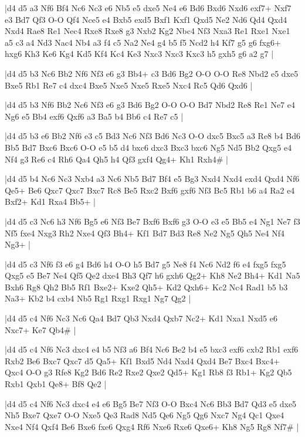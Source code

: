\whitename{}
\blackname{}
\makegametitle
|d4 d5 a3 Nf6 Bf4 Nc6 Nc3 e6 Nb5 e5 dxe5 Ne4 e6 Bd6 Bxd6 Nxd6 exf7+ Nxf7 e3 Bd7 Qf3 O-O Qf4 Nce5 e4 Bxb5 exd5 Bxf1 Kxf1 Qxd5 Ne2 Nd6 Qd4 Qxd4 Nxd4 Rae8 Re1 Nec4 Rxe8 Rxe8 g3 Nxb2 Kg2 Nbc4 Nf3 Nxa3 Re1 Rxe1 Nxe1 a5 c3 a4 Nd3 Nac4 Nb4 a3 f4 c5 Na2 Ne4 g4 b5 f5 Ncd2 h4 Kf7 g5 g6 fxg6+ hxg6 Kh3 Ke6 Kg4 Kd5 Kf4 Kc4 Ke3 Nxc3 Nxc3 Kxc3 h5 gxh5 g6 a2 g7  |

\whitename{}
\blackname{}
\makegametitle
|d4 d5 b3 Nc6 Bb2 Nf6 Nf3 e6 g3 Bb4+ c3 Bd6 Bg2 O-O O-O Re8 Nbd2 e5 dxe5 Bxe5 Rb1 Re7 c4 dxc4 Bxe5 Nxe5 Nxe5 Rxe5 Nxc4 Rc5 Qd6 Qxd6  |

\whitename{}
\blackname{}
\makegametitle
|d4 d5 b3 Nf6 Bb2 Nc6 Nf3 e6 g3 Bd6 Bg2 O-O O-O Bd7 Nbd2 Re8 Re1 Ne7 e4 Ng6 e5 Bb4 exf6 Qxf6 a3 Ba5 b4 Bb6 c4 Re7 c5  |

\whitename{}
\blackname{}
\makegametitle
|d4 d5 b3 e6 Bb2 Nf6 e3 c5 Bd3 Nc6 Nf3 Bd6 Nc3 O-O dxc5 Bxc5 a3 Re8 b4 Bd6 Bb5 Bd7 Bxc6 Bxc6 O-O e5 b5 d4 bxc6 dxc3 Bxc3 bxc6 Ng5 Nd5 Bb2 Qxg5 e4 Nf4 g3 Re6 c4 Rh6 Qa4 Qh5 h4 Qf3 gxf4 Qg4+ Kh1 Rxh4\#  |

\whitename{}
\blackname{}
\makegametitle
|d4 d5 b4 Nc6 Nc3 Nxb4 a3 Nc6 Nb5 Bd7 Bf4 e5 Bg3 Nxd4 Nxd4 exd4 Qxd4 Nf6 Qe5+ Be6 Qxc7 Qxc7 Bxc7 Rc8 Be5 Rxc2 Bxf6 gxf6 Nf3 Bc5 Rb1 b6 a4 Ra2 e4 Bxf2+ Kd1 Rxa4 Bb5+  |

\whitename{}
\blackname{}
\makegametitle
|d4 d5 c3 Nc6 h3 Nf6 Bg5 e6 Nf3 Be7 Bxf6 Bxf6 g3 O-O e3 e5 Bb5 e4 Ng1 Ne7 f3 Nf5 fxe4 Nxg3 Rh2 Nxe4 Qf3 Bh4+ Kf1 Bd7 Bd3 Re8 Ne2 Ng5 Qh5 Ne4 Nf4 Ng3+  |

\whitename{}
\blackname{}
\makegametitle
|d4 d5 c3 Nf6 f3 e6 g4 Bd6 h4 O-O h5 Bd7 g5 Ne8 f4 Nc6 Nd2 f6 e4 fxg5 fxg5 Qxg5 e5 Be7 Ne4 Qf5 Qe2 dxe4 Bh3 Qf7 h6 gxh6 Qg2+ Kh8 Ne2 Bh4+ Kd1 Na5 Bxh6 Rg8 Qh2 Bb5 Rf1 Bxe2+ Kxe2 Qh5+ Kd2 Qxh6+ Kc2 Nc4 Rad1 b5 b3 Na3+ Kb2 b4 cxb4 Nb5 Rg1 Rxg1 Rxg1 Ng7 Qg2  |

\whitename{}
\blackname{}
\makegametitle
|d4 d5 c4 Nf6 Nc3 Nc6 Qa4 Bd7 Qb3 Nxd4 Qxb7 Nc2+ Kd1 Nxa1 Nxd5 e6 Nxc7+ Ke7 Qb4\#  |

\whitename{}
\blackname{}
\makegametitle
|d4 d5 c4 Nf6 Nc3 dxc4 e4 b5 Nf3 a6 Bf4 Nc6 Be2 b4 e5 bxc3 exf6 cxb2 Rb1 exf6 Rxb2 Be6 Bxc7 Qxc7 d5 Qa5+ Kf1 Bxd5 Nd4 Nxd4 Qxd4 Be7 Bxc4 Bxc4+ Qxc4 O-O g3 Rfe8 Kg2 Bd6 Re2 Rxe2 Qxe2 Qd5+ Kg1 Rb8 f3 Rb1+ Kg2 Qb5 Rxb1 Qxb1 Qe8+ Bf8 Qe2  |

\whitename{}
\blackname{}
\makegametitle
|d4 d5 c4 Nf6 Nc3 dxc4 e4 e6 Bg5 Be7 Nf3 O-O Bxc4 Nc6 Bb3 Bd7 Qd3 e5 dxe5 Nh5 Bxe7 Qxe7 O-O Nxe5 Qe3 Rad8 Nd5 Qe6 Ng5 Qg6 Nxc7 Ng4 Qc1 Qxe4 Nxe4 Nf4 Qxf4 Be6 Bxe6 fxe6 Qxg4 Rf6 Nxe6 Rxe6 Qxe6+ Kh8 Ng5 Rg8 Nf7\#  |

